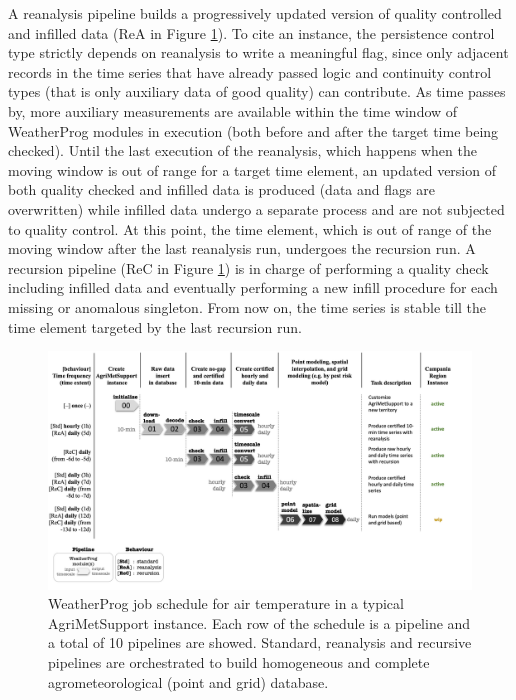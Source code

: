\documentclass[authoryear,preprint,review,12pt]{elsarticle}
\begin{document}
A reanalysis pipeline builds a progressively updated version of quality controlled and infilled data (ReA in Figure \ref{Fig:weatherprog:calls}).
To cite an instance, the persistence control type strictly depends on reanalysis to write a meaningful flag, since only adjacent records in the time series that have already passed logic and continuity control types (that is only auxiliary data of good quality) can contribute. %
As time passes by, more auxiliary measurements are available within the time window of WeatherProg modules in execution (both before and after the target time being checked). 
Until the last execution of the reanalysis, which happens when the moving window is out of range for a target time element, an updated version of both quality checked and infilled data is produced (data and flags are overwritten) while infilled data undergo a separate process and are not subjected to quality control.
At this point, the time element, which is out of range of the moving window after the last reanalysis run, undergoes the recursion run.
A recursion pipeline (ReC in Figure \ref{Fig:weatherprog:calls}) is in charge of performing a quality check including infilled data and eventually performing a new infill procedure for each missing or anomalous singleton.
From now on, the time series is stable till the time element targeted by the last recursion run.

\begin{figure}
	\centering %
	\includegraphics[scale=.6, angle=90, trim=0 2cm 7cm 2cm]{figures/WeatherProg-schedule-fig-v2.png}
	\caption{WeatherProg job schedule for air temperature in a typical AgriMetSupport instance.
 Each row of the schedule is a pipeline and a total of 10 pipelines are showed.
 Standard, reanalysis and recursive pipelines are orchestrated to build homogeneous and complete agrometeorological (point and grid) database.}
	\label{Fig:weatherprog:calls}
\end{figure}
\end{document}
